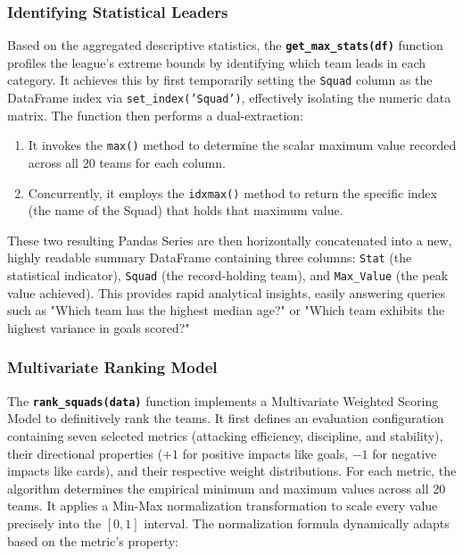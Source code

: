 \documentclass[a4paper,12pt]{report}
\begin{document}
\subsubsection{Identifying Statistical Leaders}

Based on the aggregated descriptive statistics, the \textbf{\texttt{get\_max\_}\allowbreak\texttt{stats(df)}} function profiles the league's extreme bounds by identifying which team leads in each category.
It achieves this by first temporarily setting the \texttt{Squad} column as the DataFrame index via \texttt{set\_}\allowbreak\texttt{index('Squad')}, effectively isolating the numeric data matrix. The function then performs a dual-extraction:

\begin{enumerate}
    \item It invokes the \texttt{max()} method to determine the scalar maximum value recorded across all 20 teams for each column.
    \item Concurrently, it employs the \texttt{idxmax()} method to return the specific index (the name of the Squad) that holds that maximum value.
\end{enumerate}

These two resulting Pandas Series are then horizontally concatenated into a new, highly readable summary DataFrame containing three columns: \texttt{Stat} (the statistical indicator), \texttt{Squad} (the record-holding team), and \texttt{Max\_Value} (the peak value achieved). This provides rapid analytical insights, easily answering queries such as "Which team has the highest median age?" or "Which team exhibits the highest variance in goals scored?"

\subsubsection{Multivariate Ranking Model}

The \textbf{\texttt{rank\_squads(data)}} function implements a Multivariate Weighted Scoring Model to definitively rank the teams. It first defines an evaluation configuration containing seven selected metrics (attacking efficiency, discipline, and stability), their directional properties ($+1$ for positive impacts like goals, $-1$ for negative impacts like cards), and their respective weight distributions. For each metric, the algorithm determines the empirical minimum and maximum values across all 20 teams. It applies a Min-Max normalization transformation to scale every value precisely into the $[0, 1]$ interval. The normalization formula dynamically adapts based on the metric's property:
\end{document}
